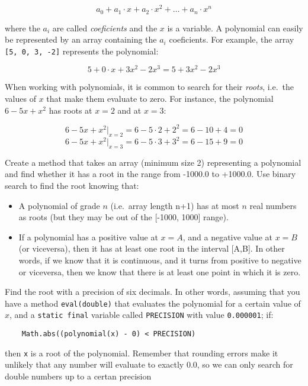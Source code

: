 \documentclass{article}
\begin{document}
$$ a_0 + a_1 \cdot x + a_2 \cdot x^2 + \ldots + a_n \cdot x^n $$ 

where the $a_i$ are called \emph{coeficients} and the $x$ is a variable. A
polynomial can easily be represented by an array containing the $a_i$
coeficients. For example, the array \verb+[5, 0, 3, -2]+ represents
the polynomial: 

$$ 5 + 0 \cdot x + 3 x^2 - 2 x^3 = 5 + 3 x^2 - 2 x^3 $$

When working with polynomials, it is common to search for their
\emph{roots}, i.e.~the values of $x$ that make them evaluate to
zero. For instance, the polynomial $6 - 5 x + x^2$ has roots 
at $x = 2$ and at $x = 3$: 

$$ 6 - 5 x + x^2 |_{x = 2} = 6 - 5 \cdot 2 + 2^2 = 6 - 10 + 4 = 0 $$
$$ 6 - 5 x + x^2 |_{x = 3} = 6 - 5 \cdot 3 + 3^2 = 6 - 15 + 9 = 0 $$

Create a method that takes an array (minimum size 2) representing a
polynomial and find whether it has a root in the range from -1000.0 to
+1000.0. Use binary search to find the root knowing that: 

\begin{itemize}
\item A polynomial of grade $n$ (i.e.~array length n+1) has at most
  $n$ real numbers as roots 
  (but they may be out of the [-1000, 1000] range).
\item If a polynomial has a positive value at $x = A$, and a negative
  value at $x = B$ (or viceversa), then it has at least one root in the
  interval [A,B]. In other words, if we know that it is continuous,
  and it turns from positive to negative or viceversa, then we know
  that there is at
  least one point in which it is zero. 
\end{itemize}

Find the root with a precision of six decimals. In other words,
assuming that you have a method \verb+eval(double)+ that evaluates the
polynomial for a certain value of $x$, and a \verb+static final+
variable called \verb+PRECISION+ with value \verb+0.000001+;  if:

\begin{verbatim}
    Math.abs((polynomial(x) - 0) < PRECISION)
\end{verbatim}

then \verb+x+ is a root of the polynomial. Remember that rounding errors make
it unlikely that any number will evaluate to exactly 0.0, so we can
only search for double numbers up to a certan precision
\end{document}
